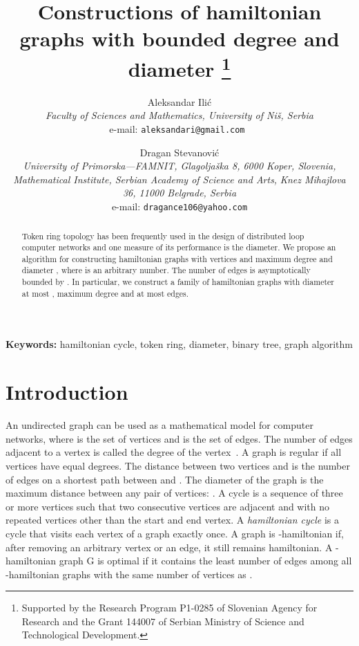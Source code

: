 \documentclass[10pt,a4paper]{article}
\title { \bigskip
    \bf {Constructions of hamiltonian graphs with
    bounded degree and diameter }
    \thanks{Supported by the Research Program P1-0285 of Slovenian Agency for Research and the Grant 144007 of Serbian Ministry of Science and Technological Development.}
}
\author
{
{\large \sc Aleksandar Ili\' c\footnotemark[3]} \\
{\em \normalsize Faculty of Sciences and Mathematics, University of Ni\v s, Serbia} \\
{\normalsize e-mail: { \tt aleksandari@gmail.com }} \and
{\large \sc Dragan Stevanovi\' c} \\
{\em \normalsize University of Primorska---FAMNIT, Glagolja\v ska 8, 6000 Koper, Slovenia,} \\
{\em \normalsize Mathematical Institute, Serbian Academy of Science
and Arts,}
{\em \normalsize Knez Mihajlova 36, 11000 Belgrade, Serbia }\\
{\normalsize e-mail: { \tt dragance106@yahoo.com}} }
\newcommand{\rz}{\vspace{0.1cm}}
\begin{document}
\maketitle

\vspace{-0.5cm}


\begin{abstract}
    Token ring topology has been frequently used in the design of
    distributed loop computer networks and one measure
    of its performance is the diameter. We
    propose an algorithm for constructing hamiltonian graphs with 
    vertices and maximum degree  and diameter ,
    where  is an arbitrary number. The number of edges is asymptotically bounded by
    .
    In particular, we construct a family of hamiltonian
    graphs with diameter at most ,
    maximum degree  and at most  edges.
\end{abstract}

{\bf {Keywords:}} hamiltonian cycle, token ring, diameter, binary
tree, graph algorithm \rz



\section{Introduction}



An undirected graph  can be used as a mathematical model
for computer networks, where  is the set of vertices and  is
the set of edges. The number of edges adjacent to a vertex  is
called the degree of the vertex~. A graph is regular if all
vertices have equal degrees. The distance  between two
vertices  and  is the number of edges on a shortest path
between  and . The diameter  of the graph is the maximum
distance between any pair of vertices: . A cycle is a sequence of three or more vertices such that two
consecutive vertices are adjacent and with no repeated vertices
other than the start and end vertex. A \emph{hamiltonian cycle} is a
cycle that visits each vertex of a graph exactly once. A graph 
is -hamiltonian if, after removing an arbitrary vertex or an
edge, it still remains hamiltonian. A -hamiltonian graph G is
optimal if it contains the least number of edges among all
-hamiltonian graphs with the same number of vertices as . \rz
\end{document}
